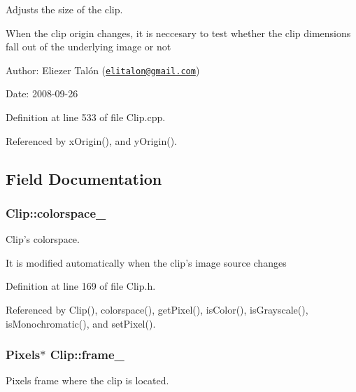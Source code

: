 Adjusts the size of the clip. 

When the clip origin changes, it is neccesary to test whether the clip dimensions fall out of the underlying image or not

\begin{Desc}
\item[Author:]Eliezer Talón (\href{mailto:elitalon@gmail.com}{\tt elitalon@gmail.com}) \end{Desc}
\begin{Desc}
\item[Date:]2008-09-26 \end{Desc}


Definition at line 533 of file Clip.cpp.

Referenced by xOrigin(), and yOrigin().

\subsection{Field Documentation}
\hypertarget{class_clip_51b03c04118374cedeaa0d7a0ba37079}{
\subsubsection[colorspace\_\-]{ {\bf Clip::colorspace\_\-}}}
\label{class_clip_51b03c04118374cedeaa0d7a0ba37079}


Clip's colorspace. 

It is modified automatically when the clip's image source changes 

Definition at line 169 of file Clip.h.

Referenced by Clip(), colorspace(), getPixel(), isColor(), isGrayscale(), isMonochromatic(), and setPixel().\hypertarget{class_clip_2978b7e7061c444375c005ffc3d24416}{
\subsubsection[frame\_\-]{\setlength{\rightskip}{0pt plus 5cm}Pixels$\ast$ {\bf Clip::frame\_\-}}}
\label{class_clip_2978b7e7061c444375c005ffc3d24416}


Pixels frame where the clip is located. 

